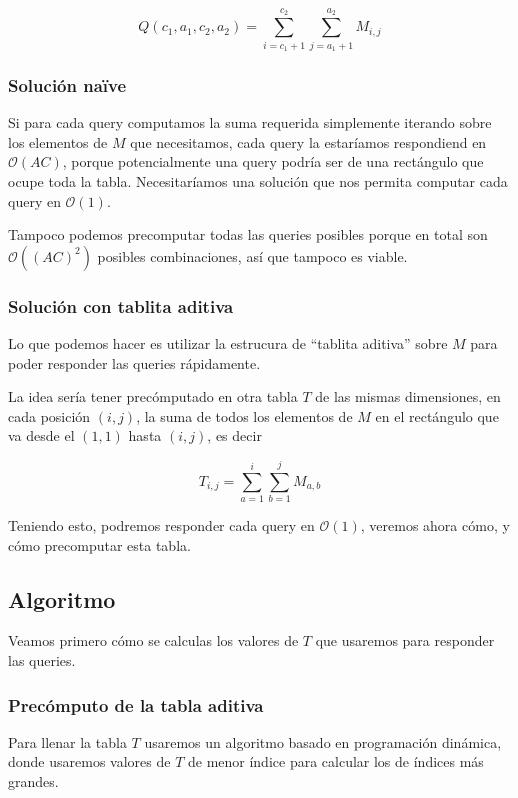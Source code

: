 \begin{equation}
Q(c_1, a_1, c_2, a_2) = \sum\limits_{i = c_1+1}^{c_2} \sum\limits_{j = a_1+1}^{a_2} M_{i,j}
\end{equation}

\subsubsection*{Solución naïve}
Si para cada query computamos la suma requerida simplemente iterando sobre los elementos 
de $M$ que necesitamos, cada query la estaríamos respondiend en $\mathcal{O}(AC)$, porque potencialmente 
una query podría ser de una rectángulo que ocupe toda la tabla. Necesitaríamos una solución 
que nos permita computar cada query en $\mathcal{O}(1)$. 

Tampoco podemos precomputar todas las queries posibles porque en total son $\mathcal{O}((AC)^2)$ 
posibles combinaciones, así que tampoco es viable.  

\subsubsection*{Solución con tablita aditiva}
Lo que podemos hacer es utilizar la estrucura de ``tablita aditiva'' sobre $M$ 
para poder responder las queries rápidamente. 

La idea sería tener precómputado en otra tabla $T$ de las mismas dimensiones, en cada 
posición $(i,j)$, la suma de todos los elementos de $M$ en el rectángulo que va desde el $(1,1)$ 
hasta $(i,j)$, es decir 

\begin{equation}
T_{i,j} = \sum\limits_{a = 1}^{i} \sum\limits_{b = 1}^{j} M_{a,b}
\end{equation}

Teniendo esto, podremos responder cada query en $\mathcal{O}(1)$, veremos ahora 
cómo, y cómo precomputar esta tabla. 


\subsection{Algoritmo}

Veamos primero cómo se calculas los valores de $T$ que usaremos para responder las queries. 

\subsubsection*{Precómputo de la tabla aditiva}
Para llenar la tabla $T$ usaremos un algoritmo basado en programación dinámica, 
donde usaremos valores de $T$ de menor índice para calcular los de índices más grandes. 

